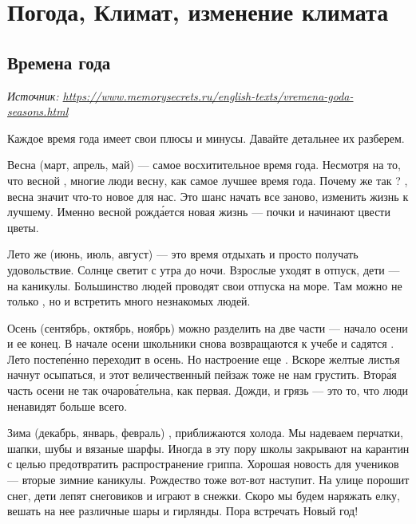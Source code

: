 \chapter{Погода, Климат, изменение климата}

\section{Времена года}
\textit{Источник: \url{https://www.memorysecrets.ru/english-texts/vremena-goda-seasons.html}}

Каждое время года имеет свои плюсы и минусы. Давайте детальнее их разберем.

Весна (март, апрель, май) --- самое восхитительное время года. Несмотря на то, что весной  , многие люди  весну, как самое лучшее время года. Почему же так ? , весна значит что-то новое для нас. Это шанс начать все заново, изменить жизнь к лучшему. Именно весной рожд\'{а}ется новая жизнь ---  почки и начинают цвести цветы.

Лето же (июнь, июль, август) --- это время отдыхать и просто получать удовольствие. Солнце светит с утра до ночи. Взрослые уходят в отпуск, дети --- на каникулы. Большинство людей проводят свои отпуска на море. Там можно не только , но и встретить много незнакомых людей.

Осень (сентябрь, октябрь, ноябрь) можно разделить на две части --- начало осени и ее конец. В начале осени школьники снова возвращаются к учебе и садятся . Лето постеп\'{е}нно переходит в осень. Но настроение еще . Вскоре желтые листья начнут осыпаться, и этот величественный пейзаж тоже не  нам грустить. Втор\'{а}я часть осени не так очаров\'{а}тельна, как первая. Дожди,  и грязь --- это то, что люди ненавидят больше всего.

Зима (декабрь, январь, февраль) , приближаются холода. Мы надеваем перчатки, шапки, шубы и вязаные шарфы. Иногда в эту пору школы закрывают на карантин с целью предотвратить распространение гриппа. Хорошая новость для учеников --- вторые зимние каникулы. Рождество тоже вот-вот наступит. На улице порошит снег, дети лепят снеговиков и играют в снежки. Скоро мы будем наряжать елку, вешать на нее различные шары и гирлянды. Пора встречать Новый год!

